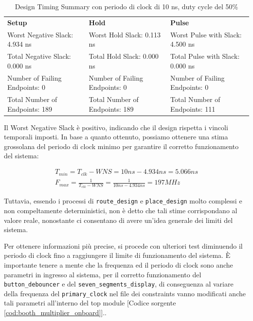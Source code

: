 \begin{table}[h!]
    \centering \scriptsize
    \begin{tabular}{p{4.8cm}p{4.8cm}p{4.8cm}}
        \hline
        \textbf{Setup} & \textbf{Hold} & \textbf{Pulse} \\
        Worst Negative Slack: \hfill 4.934 ns &
        Worst Hold Slack: \hfill 0.113 ns &
        Worst Pulse with Slack: \hfill 4.500 ns \\
        Total Negative Slack: \hfill 0.000 ns &
        Total Hold Slack: \hfill 0.000 ns &
        Total Pulse with Slack: \hfill 0.000 ns \\
        Number of Failing Endpoints: \hfill 0 &
        Number of Failing Endpoints: \hfill 0 &
        Number of Failing Endpoints: \hfill 0 \\
        Total Number of Endpoints: \hfill 189 &
        Total Number of Endpoints: \hfill 189 &
        Total Number of Endpoints: \hfill 111 \\
        \hline
    \end{tabular}
    \caption{Design Timing Summary con periodo di clock di 10 ns, duty cycle del 50\%}
    \label{tab:timing_analysis_10ns}
\end{table}

Il Worst Negative Slack è positivo, indicando che il design rispetta i vincoli temporali imposti. In base a quanto ottenuto, possiamo ottenere una stima grossolana del periodo di clock minimo per garantire il corretto funzionamento del sistema:

\begin{align*}
    T_{min} = T_{clk} - WNS = 10 ns - 4.934 ns = 5.066 ns \\
    F_{max} = \frac{1}{T_{clk} - WNS} = \frac{1}{10 ns - 4.934 ns} = 197 MHz
\end{align*}

Tuttavia, essendo i processi di \texttt{route\_design} e \texttt{place\_design} molto complessi e non compeltamente deterministici, non è detto che tali stime corrispondano al valore reale, nonostante ci consentano di avere un'idea generale dei limiti del sistema.

Per ottenere informazioni più precise, si procede con ulteriori test diminuendo il periodo di clock fino a raggiungere il limite di funzionamento del sistema. È importante tenere a mente che la frequenza ed il periodo di clock sono anche parametri in ingresso al sistema, per il corretto funzionamento del \texttt{button\_debouncer} e del \texttt{seven\_segments\_display}, di conseguenza al variare della frequenza del \texttt{primary\_clock} nel file dei constraints vanno modificati anche tali parametri all'interno del top module [Codice sorgente \ref{cod:booth_multiplier_onboard}]..

